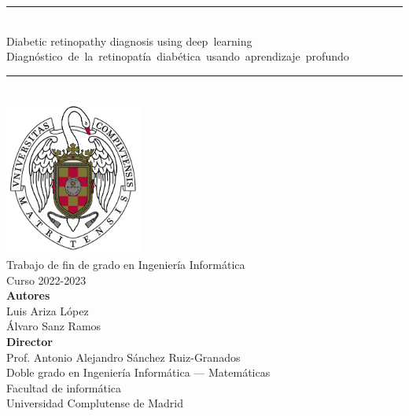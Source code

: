 \newpage
\thispagestyle{empty}

\begin{center}
    \rule{7cm}{1pt} \\
    \vspace*{0.2cm}
    \Large{Diabetic retinopathy diagnosis using deep learning} \\
    \vspace*{0.2cm}
    \hspace*{-0.8cm}\mbox{\large{Diagnóstico de la retinopatía diabética usando aprendizaje profundo}} \\
    \vspace*{0.2cm}
    \rule{7cm}{1pt} \\
    \vspace*{1cm} 
    \includegraphics[height=2in]{figures/escudo.png} \\
    \vspace{0.75cm}
    \Large{Trabajo de fin de grado en Ingeniería Informática} \\
    \Large{Curso 2022-2023} \\
    \vspace{0.75cm}
    \large{\textbf{Autores}} \\
    \large{Luis Ariza López} \\
    \large{Álvaro Sanz Ramos} \\ 
    \vspace{0.25cm}
    \large{\textbf{Director}} \\
    \large{Prof. Antonio Alejandro Sánchez Ruiz-Granados} \\

    \vspace{0.75cm}
    Doble grado en Ingeniería Informática — Matemáticas \\
    Facultad de informática \\
    Universidad Complutense de Madrid \\
    \vspace{1cm}
\end{center}
